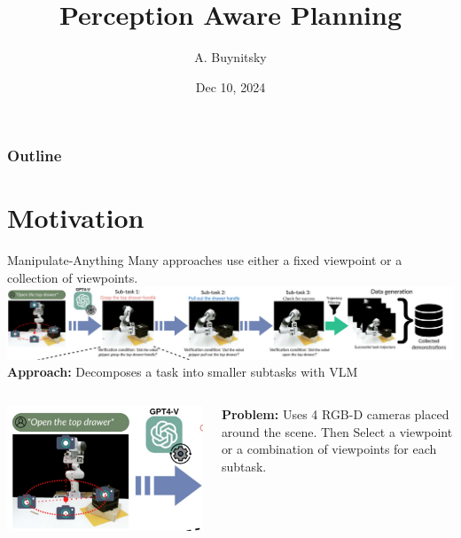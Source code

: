 \documentclass{beamer}
\title[Active Vision for Bi-Manipulator Systems]{Perception Aware Planning}
\author[CS 592-RM]{A. Buynitsky}
\date{Dec 10, 2024}
\begin{document}
\frame{\titlepage}


\begin{frame}
\frametitle{Outline}
\tableofcontents
\end{frame}
\section{Motivation}
\begin{frame}[t]{Manipulate-Anything}
    \vspace{-1em}
    Many approaches use either a fixed viewpoint or a collection of viewpoints.
    \includegraphics[width=\textwidth]{./img/motivation_0.png}
    \textbf{Approach:} Decomposes a task into smaller subtasks with VLM
    \pause
    \begin{columns}
		\begin{column}{.5\textwidth}
            \begin{center}
                \vspace{-1em}
                \includegraphics[width=\textwidth]{./img/motivation_1.png}
            \end{center}
		\end{column}
		\hspace{1em}
		\begin{column}{.5\textwidth}
            \textbf{Problem:} Uses 4 RGB-D cameras placed around the scene. Then Select a viewpoint or a combination of viewpoints for each subtask.
		\end{column}
	\end{columns}
\end{frame}
\end{document}
